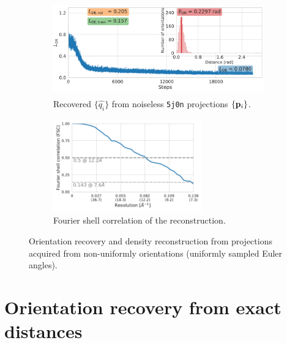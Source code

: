 \begin{figure}[ht!]
    \centering
    \begin{subfigure}[b]{0.60\linewidth}
        \centering
        \includegraphics[height=4cm]{figures/5j0n_ar_aa_fullcvg.pdf}
        \caption{Recovered $\{ \widehat{q_i} \}$ from noiseless \texttt{5j0n} projections $\{ \mathbf{p}_i \}$.}
    \end{subfigure}
    \hfill
    \begin{subfigure}[b]{0.38\linewidth}
        \centering
        \includegraphics[height=4cm]{figures/5j0n_fullcvg_noise0_FSC_apr_init_customFSC.pdf}
        
        \caption{Fourier shell correlation of the reconstruction.}
    \end{subfigure}
    \caption{%
        Orientation recovery and density reconstruction from projections acquired from non-uniformly orientations (uniformly sampled Euler angles).
    }\label{fig:recovery-nonuniform}
\end{figure}

\section{Orientation recovery from exact distances}\label{apx:results:orientation-recovery:exact}



